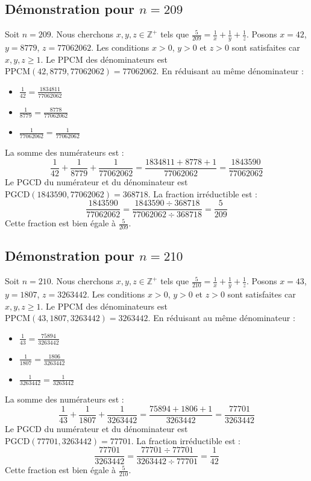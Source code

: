 \documentclass[11pt,a4paper]{article}
\begin{document}
\subsection{Démonstration pour $n = 209$}
Soit $n = 209$. Nous cherchons $x, y, z \in \mathbb{Z}^{+}$ tels que $\frac{5}{209} = \frac{1}{x} + \frac{1}{y} + \frac{1}{z}$.
Posons $x = 42$, $y = 8779$, $z = 77062062$.
Les conditions $x > 0$, $y > 0$ et $z > 0$ sont satisfaites car $x, y, z \geq 1$.
Le PPCM des dénominateurs est $\text{PPCM}(42, 8779, 77062062) = 77062062$.
En réduisant au même dénominateur :
\begin{itemize}
    \item $\frac{1}{42} = \frac{1834811}{77062062}$
    \item $\frac{1}{8779} = \frac{8778}{77062062}$
    \item $\frac{1}{77062062} = \frac{1}{77062062}$
\end{itemize}
La somme des numérateurs est :
$$ \frac{1}{42} + \frac{1}{8779} + \frac{1}{77062062} = \frac{1834811 + 8778 + 1}{77062062} = \frac{1843590}{77062062} $$
Le PGCD du numérateur et du dénominateur est $\text{PGCD}(1843590, 77062062) = 368718$.
La fraction irréductible est :
$$ \frac{1843590}{77062062} = \frac{1843590 \div 368718}{77062062 \div 368718} = \frac{5}{209} $$
Cette fraction est bien égale à $\frac{5}{209}$.

\subsection{Démonstration pour $n = 210$}
Soit $n = 210$. Nous cherchons $x, y, z \in \mathbb{Z}^{+}$ tels que $\frac{5}{210} = \frac{1}{x} + \frac{1}{y} + \frac{1}{z}$.
Posons $x = 43$, $y = 1807$, $z = 3263442$.
Les conditions $x > 0$, $y > 0$ et $z > 0$ sont satisfaites car $x, y, z \geq 1$.
Le PPCM des dénominateurs est $\text{PPCM}(43, 1807, 3263442) = 3263442$.
En réduisant au même dénominateur :
\begin{itemize}
    \item $\frac{1}{43} = \frac{75894}{3263442}$
    \item $\frac{1}{1807} = \frac{1806}{3263442}$
    \item $\frac{1}{3263442} = \frac{1}{3263442}$
\end{itemize}
La somme des numérateurs est :
$$ \frac{1}{43} + \frac{1}{1807} + \frac{1}{3263442} = \frac{75894 + 1806 + 1}{3263442} = \frac{77701}{3263442} $$
Le PGCD du numérateur et du dénominateur est $\text{PGCD}(77701, 3263442) = 77701$.
La fraction irréductible est :
$$ \frac{77701}{3263442} = \frac{77701 \div 77701}{3263442 \div 77701} = \frac{1}{42} $$
Cette fraction est bien égale à $\frac{5}{210}$.
\end{document}
